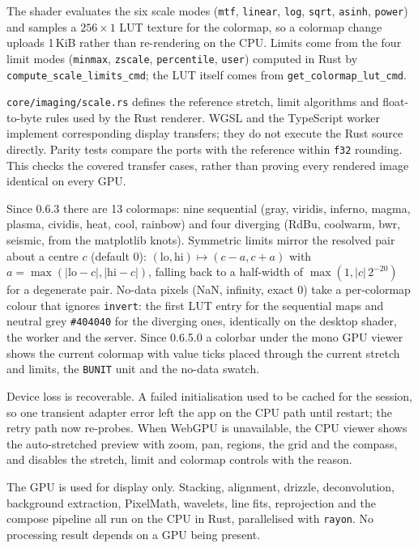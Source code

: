 \documentclass[11pt,a4paper]{article}
\newcommand{\code}[1]{\texttt{\small #1}}
\newcommand{\crate}[1]{\texttt{#1}}
\begin{document}
    The shader evaluates the six scale modes (\code{mtf}, \code{linear}, \code{log}, \code{sqrt}, \code{asinh}, \code{power}) and samples a $256 \times 1$ LUT texture for the colormap, so a colormap change uploads 1\,KiB rather than re-rendering on the CPU. Limits come from the four limit modes (\code{minmax}, \code{zscale}, \code{percentile}, \code{user}) computed in Rust by \code{compute\_scale\_limits\_cmd}; the LUT itself comes from \code{get\_colormap\_lut\_cmd}.

    \code{core/imaging/scale.rs} defines the reference stretch, limit algorithms and float-to-byte rules used by the Rust renderer. WGSL and the TypeScript worker implement corresponding display transfers; they do not execute the Rust source directly. Parity tests compare the ports with the reference within \code{f32} rounding. This checks the covered transfer cases, rather than proving every rendered image identical on every GPU.

    Since 0.6.3 there are 13 colormaps: nine sequential (gray, viridis, inferno, magma, plasma, cividis, heat, cool, rainbow) and four diverging (RdBu, coolwarm, bwr, seismic, from the matplotlib knots). Symmetric limits mirror the resolved pair about a centre $c$ (default 0): $(\text{lo}, \text{hi}) \mapsto (c - a, c + a)$ with $a = \max(|\text{lo} - c|, |\text{hi} - c|)$, falling back to a half-width of $\max(1, |c|\,2^{-20})$ for a degenerate pair. No-data pixels (NaN, infinity, exact 0) take a per-colormap colour that ignores \code{invert}: the first LUT entry for the sequential maps and neutral grey \code{\#404040} for the diverging ones, identically on the desktop shader, the worker and the server. Since 0.6.5.0 a colorbar under the mono GPU viewer shows the current colormap with value ticks placed through the current stretch and limits, the \code{BUNIT} unit and the no-data swatch.

    Device loss is recoverable. A failed initialisation used to be cached for the session, so one transient adapter error left the app on the CPU path until restart; the retry path now re-probes. When WebGPU is unavailable, the CPU viewer shows the auto-stretched preview with zoom, pan, regions, the grid and the compass, and disables the stretch, limit and colormap controls with the reason.

    \begin{notebox}
        The GPU is used for display only. Stacking, alignment, drizzle, deconvolution, background extraction, PixelMath, wavelets, line fits, reprojection and the compose pipeline all run on the CPU in Rust, parallelised with \crate{rayon}. No processing result depends on a GPU being present.
    \end{notebox}
\end{document}
